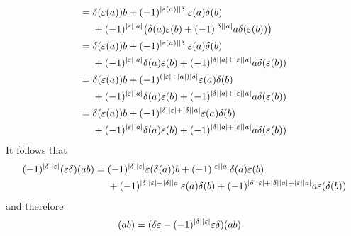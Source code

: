 \documentclass[a4paper,10pt,headings=standardclasses]{scrartcl}
\begin{document}
\begin{enumerate}
\begin{align*}
      ={}&
        \delta(\varepsilon(a)) b
      + (-1)^{\lvert\varepsilon(a)\rvert \lvert\delta\rvert}
        \varepsilon(a) \delta(b)
      \\
      {}&
      + (-1)^{\lvert\varepsilon\rvert \lvert a\rvert}
        \bigl(
            \delta(a)\varepsilon(b)
          + (-1)^{\lvert\delta\rvert \lvert a\rvert} a \delta(\varepsilon(b))
        \bigr)
      \\
      ={}&
        \delta(\varepsilon(a)) b
      + (-1)^{\lvert\varepsilon(a)\rvert \lvert\delta\rvert}
        \varepsilon(a) \delta(b)
      \\
      {}&
      + (-1)^{\lvert\varepsilon\rvert \lvert a\rvert} \delta(a)\varepsilon(b)
      + (-1)^{\lvert\delta\rvert \lvert a\rvert + \lvert\varepsilon\rvert \lvert a\rvert}
        a \delta(\varepsilon(b))
      \\
      ={}&
        \delta(\varepsilon(a)) b
      + (-1)^{(\lvert\varepsilon\rvert + \lvert a\rvert) \lvert\delta\rvert}
        \varepsilon(a) \delta(b)
      \\
      {}&
      + (-1)^{\lvert\varepsilon\rvert \lvert a\rvert}
        \delta(a)\varepsilon(b)
      + (-1)^{\lvert\delta\rvert \lvert a\rvert + \lvert\varepsilon\rvert \lvert a\rvert}
        a \delta(\varepsilon(b))
      \\
      ={}&
        \delta(\varepsilon(a)) b
      + (-1)^{\lvert\delta\rvert \lvert\varepsilon\rvert + \lvert\delta\rvert \lvert a\rvert}
        \varepsilon(a) \delta(b)
      \\
      {}&
      + (-1)^{\lvert\varepsilon\rvert \lvert a\rvert}
        \delta(a) \varepsilon(b)
      + (-1)^{\lvert\delta\rvert \lvert a\rvert + \lvert\varepsilon\rvert \lvert a\rvert}
        a \delta(\varepsilon(b))
    \end{align*}
    \endgroup
    It follows that
    \begin{align*}
      (-1)^{\lvert\delta\rvert \lvert\varepsilon\rvert}
      (\varepsilon \delta)(ab)
      ={}&
        (-1)^{\lvert\delta\rvert \lvert\varepsilon\rvert}
        \varepsilon(\delta(a)) b
      + (-1)^{\lvert\varepsilon\rvert \lvert a\rvert}
        \delta(a) \varepsilon(b)
      \\
      {}&
      + (-1)^{\lvert\delta\rvert \lvert\varepsilon\rvert + \lvert\delta\rvert \lvert a\rvert}
        \varepsilon(a) \delta(b)
      + (-1)^{\lvert\delta\rvert \lvert\varepsilon\rvert  + \lvert\delta\rvert \lvert a\rvert + \lvert\varepsilon\rvert \lvert a\rvert}
        a \varepsilon(\delta(b))
    \end{align*}
    and therefore
    \begingroup
    \allowdisplaybreaks
    \begin{align*}
      [\delta, \varepsilon](ab)
      ={}&
      (\delta \varepsilon - (-1)^{\hdeg{\delta} \hdeg{\varepsilon}} \varepsilon \delta)(ab)

\end{align*}
\end{enumerate}
\end{document}
